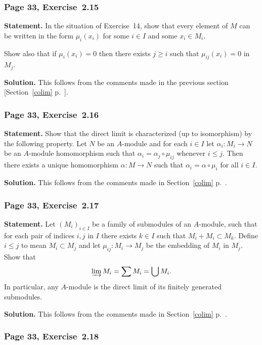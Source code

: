 \documentclass[12pt,letterpaper]{article}%
\newcommand{\nn}{\noindent}
\begin{document}
\subsubsection{Page 33, Exercise~2.15}\label{ex2.15}%

\textbf{Statement.} In the situation of Exercise~14, show that every element of $M$ can be written in the form $\mu_i(x_i)$ for some $i\in I$ and some $x_i\in M_i$.

Show also that if $\mu_i(x_i)=0$ then there exists $j\ge i$ such that $\mu_{ij}(x_i)=0$ in $M_j$.

\nn\textbf{Solution.} This follows from the comments made in the previous section [Section~\ref{colim} p.~\pageref{colim}].%

\subsubsection{Page 33, Exercise~2.16}\label{ex2.16}%

\textbf{Statement.} Show that the direct limit is characterized (up to isomorphism) by the following property. Let $N$ be an $A$-module and for each $i\in I$ let $\alpha_i:M_i\to N$ be an $A$-module homomorphism such that $\alpha_i=\alpha_j\circ\mu_{ij}$ whenever $i\le j$. Then there exists a unique homomorphism $\alpha:M\to N$ such that $\alpha_i=\alpha\circ\mu_i$ for all $i\in I$.

\nn\textbf{Solution.} This follows from the comments made in Section~\ref{colim} p.~\pageref{colim}.%

\subsubsection{Page 33, Exercise~2.17}%

\textbf{Statement.} Let $(M_i)_{i\in I}$ be a family of submodules of an $A$-module, such that for each pair of indices $i,j$ in $I$ there exists $k\in I$ such that $M_i+M_i\subset M_k$. Define $i\le j$ to mean $M_i\subset M_j$ and let $\mu_{ij}:M_i\to M_j$ be the embedding of $M_i$ in $M_j$. Show that
$$
\varinjlim M_i=\sum M_i=\bigcup M_i.
$$
In particular, any $A$-module is the direct limit of its finitely generated submodules.

\nn\textbf{Solution.} This follows from the comments made in Section~\ref{colim} p.~\pageref{colim}.%

\subsubsection{Page 33, Exercise~2.18}%
\end{document}
